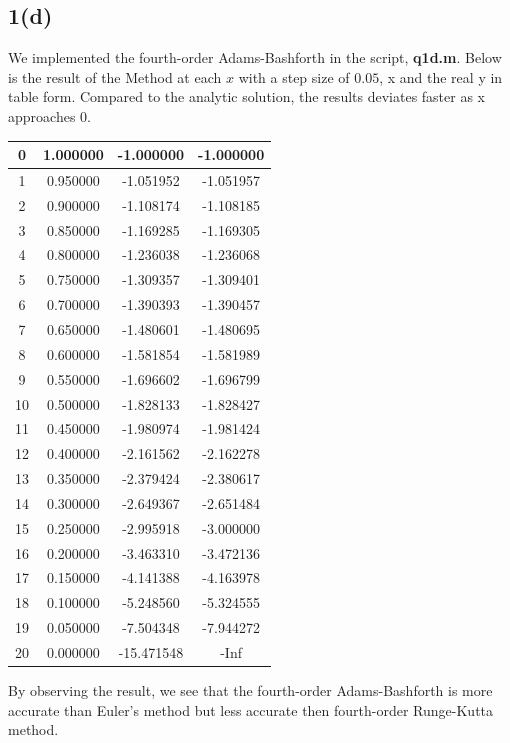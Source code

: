 \documentclass{article}
\begin{document}
\subsection*{1(d)}
We implemented the fourth-order Adams-Bashforth in the script, \textbf{q1d.m}. Below is the result of the Method at each $x$ with a step size of $0.05$, x and the real y in table form. Compared to the analytic solution, the results deviates faster as x approaches 0. 
\begin{center}
\begin{tabular}{|c|c|c|c|}
\hline
0 & 1.000000 & -1.000000 & -1.000000 \\ \hline 
1 & 0.950000 & -1.051952 & -1.051957 \\ \hline 
2 & 0.900000 & -1.108174 & -1.108185 \\ \hline 
3 & 0.850000 & -1.169285 & -1.169305 \\ \hline 
4 & 0.800000 & -1.236038 & -1.236068 \\ \hline 
5 & 0.750000 & -1.309357 & -1.309401 \\ \hline 
6 & 0.700000 & -1.390393 & -1.390457 \\ \hline 
7 & 0.650000 & -1.480601 & -1.480695 \\ \hline 
8 & 0.600000 & -1.581854 & -1.581989 \\ \hline 
9 & 0.550000 & -1.696602 & -1.696799 \\ \hline 
10 & 0.500000 & -1.828133 & -1.828427 \\ \hline 
11 & 0.450000 & -1.980974 & -1.981424 \\ \hline 
12 & 0.400000 & -2.161562 & -2.162278 \\ \hline 
13 & 0.350000 & -2.379424 & -2.380617 \\ \hline 
14 & 0.300000 & -2.649367 & -2.651484 \\ \hline 
15 & 0.250000 & -2.995918 & -3.000000 \\ \hline 
16 & 0.200000 & -3.463310 & -3.472136 \\ \hline 
17 & 0.150000 & -4.141388 & -4.163978 \\ \hline 
18 & 0.100000 & -5.248560 & -5.324555 \\ \hline 
19 & 0.050000 & -7.504348 & -7.944272 \\ \hline 
20 & 0.000000 & -15.471548 & -Inf \\ \hline 
\end{tabular}
\end{center}
By observing the result, we see that the fourth-order Adams-Bashforth is more accurate than Euler's method but less accurate then fourth-order Runge-Kutta method.
\end{document}

